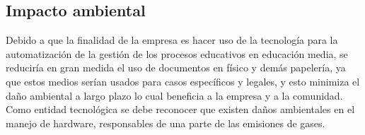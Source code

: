 \subsection{Impacto ambiental}

Debido a que la finalidad de la empresa es hacer uso de la tecnología para la automatización de la gestión de los procesos educativos en educación media, se reduciría en gran medida el uso de documentos en físico y demás papelería, ya que estos medios serían usados para casos específicos y legales, y esto minimiza el daño ambiental a largo plazo lo cual beneficia a la empresa y a la comunidad. Como entidad tecnológica se debe reconocer que existen daños ambientales en el manejo de hardware, responsables de una parte de las emisiones de gases.